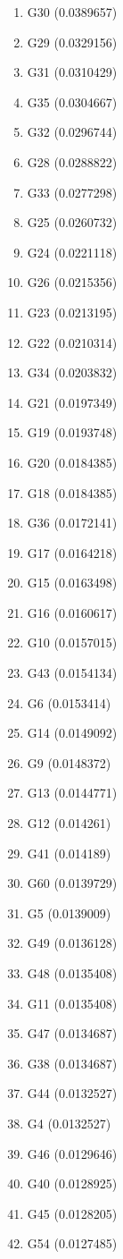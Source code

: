 \begin{enumerate}
\item G30 (0.0389657)
\item G29 (0.0329156)
\item G31 (0.0310429)
\item G35 (0.0304667)
\item G32 (0.0296744)
\item G28 (0.0288822)
\item G33 (0.0277298)
\item G25 (0.0260732)
\item G24 (0.0221118)
\item G26 (0.0215356)
\item G23 (0.0213195)
\item G22 (0.0210314)
\item G34 (0.0203832)
\item G21 (0.0197349)
\item G19 (0.0193748)
\item G20 (0.0184385)
\item G18 (0.0184385)
\item G36 (0.0172141)
\item G17 (0.0164218)
\item G15 (0.0163498)
\item G16 (0.0160617)
\item G10 (0.0157015)
\item G43 (0.0154134)
\item G6 (0.0153414)
\item G14 (0.0149092)
\item G9 (0.0148372)
\item G13 (0.0144771)
\item G12 (0.014261)
\item G41 (0.014189)
\item G60 (0.0139729)
\item G5 (0.0139009)
\item G49 (0.0136128)
\item G48 (0.0135408)
\item G11 (0.0135408)
\item G47 (0.0134687)
\item G38 (0.0134687)
\item G44 (0.0132527)
\item G4 (0.0132527)
\item G46 (0.0129646)
\item G40 (0.0128925)
\item G45 (0.0128205)
\item G54 (0.0127485)

\end{enumerate}
